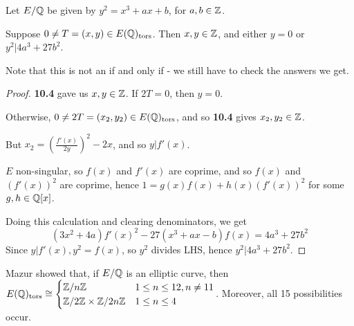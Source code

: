 \documentclass[10pt,a4paper]{article}
\begin{document}
\begin{theorem}
  Let $E/\mathbb{Q}$ be given by $y^2 = x^3+ax+b$, for $a, b \in \mathbb{Z}$.

  Suppose $0 \neq T = (x,y) \in E(\mathbb{Q})_{\text{tors}}$. Then $x,y \in \mathbb{Z}$, and either $y=0$ or $y^2 |4a^3+27b^2$.
\end{theorem}
Note that this is not an if and only if - we still have to check the answers we get.
\begin{proof}
  \textbf{10.4} gave us $x,y \in \mathbb{Z}$. If $2T = 0$, then $y=0$.

  Otherwise, $0 \neq 2T = (x_2, y_2) \in E(\mathbb{Q})_{\text{tors}}$, and so \textbf{10.4} gives $x_2, y_2 \in \mathbb{Z}$.

  But $x_2 = \left(\frac{f'(x)}{2y}\right)^2-2x$, and so $y|f'(x)$.

  $E$ non-singular, so $f(x)$ and $f'(x)$ are coprime, and so $f(x)$ and $(f'(x))^2$ are coprime, hence $1 = g(x)f(x)+h(x)(f'(x))^2$ for some $g, h \in \mathbb{Q}[x]$.

  Doing this calculation and clearing denominators, we get
  \[(3x^2+4a)f'(x)^2-27(x^3+ax-b)f(x)=4a^3+27b^2\]
  Since $y|f'(x), y^2=f(x)$, so $y^2$ divides LHS, hence $y^2|4a^3+27b^2$.
\end{proof}
Mazur showed that, if $E/\mathbb{Q}$ is an elliptic curve, then $E(\mathbb{Q})_{\text{tors}} \cong \begin{cases} \mathbb{Z}/n\mathbb{Z} & 1\leq n \leq 12, n \neq 11\\ \mathbb{Z}/2\mathbb{Z} \times \mathbb{Z}/2n\mathbb{Z} & 1\leq n \leq 4\end{cases}$. Moreover, all 15 possibilities occur.
\end{document}
